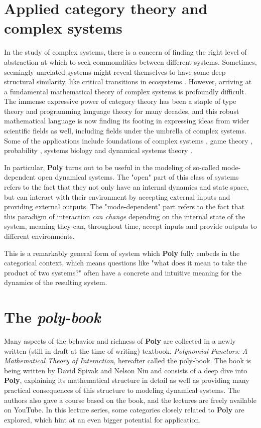 \section{Applied category theory and complex systems}
In the study of complex systems, there is a concern of finding the right level of abstraction at which to seek commonalities between different systems. Sometimes, seemingly unrelated systems might reveal themselves to have some deep structural similarity, like critical transitions in ecosystems \cite{catastrophic}. However, arriving at a fundamental mathematical theory of complex systems is profoundly difficult. The immense expressive power of category theory has been a staple of type theory and programming language theory for many decades, and this robust mathematical language is now finding its footing in expressing ideas from wider scientific fields as well, including fields under the umbrella of complex systems. Some of the applications include foundations of complex systems \cite{complexcatsadjunction}, game theory \cite{compositional-gt}, probability \cite{markov-categories}, systems biology \cite{compositional-react-net} and dynamical systems theory \cite{operad-dynsys}.

In particular, \textbf{Poly} turns out to be useful in the modeling of so-called mode-dependent open dynamical systems. The "open" part of this class of systems refers to the fact that they not only have an internal dynamics and state space, but can interact with their environment by accepting external inputs and providing external outputs. The "mode-dependent" part refers to the fact that this paradigm of interaction \textit{can change} depending on the internal state of the system, meaning they can, throughout time, accept inputs and provide outputs to different environments.

This is a remarkably general form of system which \textbf{Poly} fully embeds in the categorical context, which means questions like "what does it mean to take the product of two systems?" often have a concrete and intuitive meaning for the dynamics of the resulting system.

\section{The \textit{poly-book}}
Many aspects of the behavior and richness of \textbf{Poly} are collected in a newly written (still in draft at the time of writing) textbook, \textit{Polynomial Functors: A Mathematical Theory of Interaction}, hereafter called the poly-book. The book is being written by David Spivak and Nelson Niu and consists of a deep dive into \textbf{Poly}, explaining its mathematical structure in detail as well as providing many practical consequences of this structure to modeling dynamical systems. The authors also gave a course based on the book, and the lectures are freely available on YouTube. In this lecture series, some categories closely related to \textbf{Poly} are explored, which hint at an even bigger potential for application.



